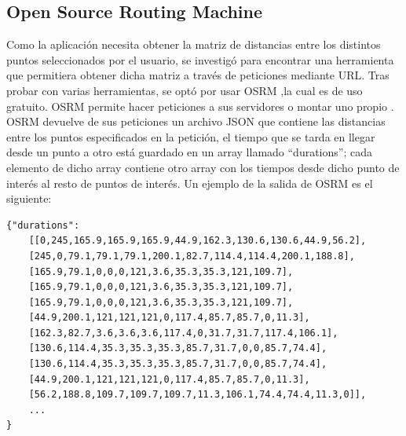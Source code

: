 \subsection[OSRM]{Open Source Routing Machine}
Como la aplicación necesita obtener la matriz de distancias entre los distintos puntos seleccionados por el usuario, se investigó para encontrar una herramienta que permitiera obtener dicha matriz a través de peticiones mediante URL.\newline
Tras probar con varias herramientas, se optó por usar OSRM \cite{osmr},la cual es de uso gratuito. OSRM permite hacer peticiones a sus servidores\cite{osmr_doc} o montar uno propio \cite{osmr_backend}.\newline
OSRM devuelve de sus peticiones un archivo JSON que contiene las distancias entre los puntos especificados en la petición, el tiempo que se tarda en llegar desde un punto a otro está guardado en un array llamado \enquote{durations}; cada elemento de dicho array contiene otro array con los tiempos desde dicho punto de interés al resto de puntos de interés. Un ejemplo de la salida de OSRM es el siguiente:
\begin{lstlisting}[caption=Salida de OSRM]
{"durations":
	[[0,245,165.9,165.9,165.9,44.9,162.3,130.6,130.6,44.9,56.2],
	[245,0,79.1,79.1,79.1,200.1,82.7,114.4,114.4,200.1,188.8],
	[165.9,79.1,0,0,0,121,3.6,35.3,35.3,121,109.7],
	[165.9,79.1,0,0,0,121,3.6,35.3,35.3,121,109.7],
	[165.9,79.1,0,0,0,121,3.6,35.3,35.3,121,109.7],
	[44.9,200.1,121,121,121,0,117.4,85.7,85.7,0,11.3],
	[162.3,82.7,3.6,3.6,3.6,117.4,0,31.7,31.7,117.4,106.1],
	[130.6,114.4,35.3,35.3,35.3,85.7,31.7,0,0,85.7,74.4],
	[130.6,114.4,35.3,35.3,35.3,85.7,31.7,0,0,85.7,74.4],
	[44.9,200.1,121,121,121,0,117.4,85.7,85.7,0,11.3],
	[56.2,188.8,109.7,109.7,109.7,11.3,106.1,74.4,74.4,11.3,0]],
	...
}
\end{lstlisting}

